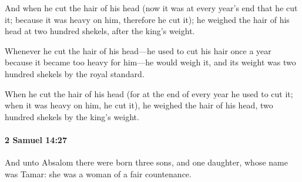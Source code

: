 			\begin{versebox}
					\item[BHS] 
					\item[ASV] And when he cut the hair of his head (now it was at every year's end that he cut it; because it was heavy on him, therefore he cut it); he weighed the hair of his head at two hundred shekels, after the king's weight.
					\item[NIV] Whenever he cut the hair of his head—he used to cut his hair once a year because it became too heavy for him—he would weigh it, and its weight was two hundred shekels by the royal standard.
					\item[NRSV] When he cut the hair of his head (for at the end of every year he used to cut it; when it was heavy on him, he cut it), he weighed the hair of his head, two hundred shekels by the king’s weight.
			\end{versebox}

		\paragraph{2 Samuel 14:27} %
			\label{2SAMUEL-14-27}

			And unto Absalom there were born three sons, and one daughter, whose name was Tamar: she was a woman of a fair countenance.

